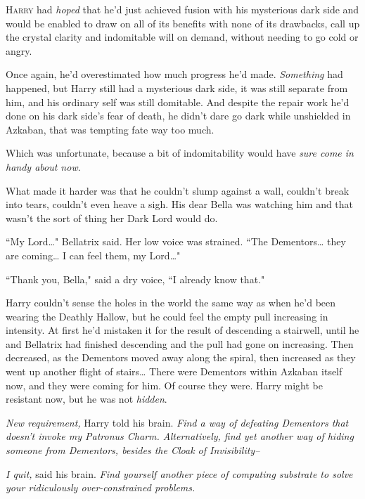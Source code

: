 
\lettrine{H}{arry} had \emph{hoped} that he'd just achieved fusion with his mysterious dark side and would be enabled to draw on all of its benefits with none of its drawbacks, call up the crystal clarity and indomitable will on demand, without needing to go cold or angry.

Once again, he'd overestimated how much progress he'd made. \emph{Something} had happened, but Harry still had a mysterious dark side, it was still separate from him, and his ordinary self was still domitable. And despite the repair work he'd done on his dark side's fear of death, he didn't dare go dark while unshielded in Azkaban, that was tempting fate way too much.

Which was unfortunate, because a bit of indomitability would have \emph{sure come in handy about now}.

What made it harder was that he couldn't slump against a wall, couldn't break into tears, couldn't even heave a sigh. His dear Bella was watching him and that wasn't the sort of thing her Dark Lord would do.

``My Lord{\ldots}" Bellatrix said. Her low voice was strained. ``The Dementors{\ldots} they are coming{\ldots} I can feel them, my Lord{\ldots}"

``Thank you, Bella," said a dry voice, ``I already know that."

Harry couldn't sense the holes in the world the same way as when he'd been wearing the Deathly Hallow, but he could feel the empty pull increasing in intensity. At first he'd mistaken it for the result of descending a stairwell, until he and Bellatrix had finished descending and the pull had gone on increasing. Then decreased, as the Dementors moved away along the spiral, then increased as they went up another flight of stairs{\ldots} There were Dementors within Azkaban itself now, and they were coming for him. Of course they were. Harry might be resistant now, but he was not \emph{hidden}.

\emph{New requirement,} Harry told his brain. \emph{Find a way of defeating Dementors that doesn't invoke my Patronus Charm. Alternatively, find yet another way of hiding someone from Dementors, besides the Cloak of Invisibility\---}

\emph{I quit,} said his brain. \emph{Find yourself another piece of computing substrate to solve your ridiculously over-constrained problems.}

